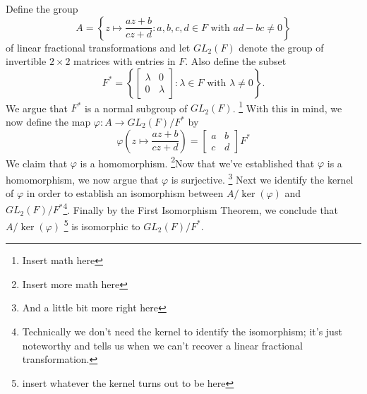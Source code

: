 \documentclass[12pt]{article}
\newcommand{\lftmat}[4]{\begin{bmatrix} {#1} & {#2} \\ {#3} & {#4} \end{bmatrix}}
\newcommand{\stanlftmat}{\lftmat{a}{b}{c}{d}}
\begin{document}
\noindent Define the group
	\[
		A = \left\lbrace z\mapsto \frac{az + b}{cz + d}\colon a,b,c,d\in F\text{ with } ad - bc \neq 0\right\rbrace
	\]
of linear fractional transformations and let $GL_2(F)$ denote the group of invertible $2\times 2$ matrices with entries in $F$. Also define the subset
	\[
		F^* = \left\lbrace\lftmat{\lambda}{0}{0}{\lambda}\colon \lambda\in F\text{ with } \lambda\neq 0 \right\rbrace.
	\]
	We argue that $F^*$ is a normal subgroup of $GL_2(F)$. \footnote{Insert math here} With this in mind, we now define the map $\varphi\colon A\rightarrow GL_2(F)/F^*$ by
	\[
		\varphi\left(z\mapsto \frac{az + b}{cz + d}\right) = \stanlftmat F^*
	\]
	We claim that $\varphi$ is a homomorphism.  \footnote{Insert more math here}Now that we've established that $\varphi$ is a homomorphism, we now argue that $\varphi$ is surjective.  \footnote{And a little bit more right here}  Next we identify the kernel of $\varphi$ in order to establish an isomorphism between $A/\ker(\varphi)$ and $GL_2(F)/F^*$\footnote{Technically we don't need the kernel to identify the isomorphism; it's just noteworthy and tells us when we can't recover a linear fractional transformation.}. Finally by the First Isomorphism Theorem, we conclude that $A/\ker(\varphi)$ \footnote{insert whatever the kernel turns out to be here} is isomorphic to $GL_2(F)/F^*$. 
	
\end{document}
